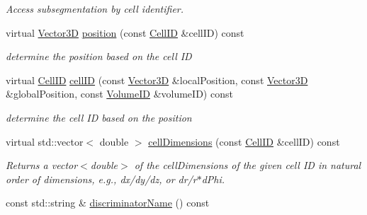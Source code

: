\begin{DoxyCompactItemize}
\begin{DoxyCompactList}\small\item\em Access subsegmentation by cell identifier. \item\end{DoxyCompactList}\item 
virtual \hyperlink{struct_d_d4hep_1_1_d_d_segmentation_1_1_vector3_d}{Vector3D} \hyperlink{class_d_d4hep_1_1_d_d_segmentation_1_1_multi_segmentation_abbcc00c36274bb97c5ff3d01d64e45b6}{position} (const \hyperlink{namespace_d_d4hep_1_1_d_d_segmentation_ac7af071d85cb48820914434a07e21ba1}{CellID} \&cellID) const 
\begin{DoxyCompactList}\small\item\em determine the position based on the cell ID \item\end{DoxyCompactList}\item 
virtual \hyperlink{namespace_d_d4hep_1_1_d_d_segmentation_ac7af071d85cb48820914434a07e21ba1}{CellID} \hyperlink{class_d_d4hep_1_1_d_d_segmentation_1_1_multi_segmentation_aefbdc896e43100b7781e07dafc9a9fec}{cellID} (const \hyperlink{struct_d_d4hep_1_1_d_d_segmentation_1_1_vector3_d}{Vector3D} \&localPosition, const \hyperlink{struct_d_d4hep_1_1_d_d_segmentation_1_1_vector3_d}{Vector3D} \&globalPosition, const \hyperlink{namespace_d_d4hep_1_1_d_d_segmentation_a61a6833a18d1800bdef176595f83e3ba}{VolumeID} \&volumeID) const 
\begin{DoxyCompactList}\small\item\em determine the cell ID based on the position \item\end{DoxyCompactList}\item 
virtual std::vector$<$ double $>$ \hyperlink{class_d_d4hep_1_1_d_d_segmentation_1_1_multi_segmentation_a2762cc8dd45fdfcab8aa8dfaea47e7fd}{cellDimensions} (const \hyperlink{namespace_d_d4hep_1_1_d_d_segmentation_ac7af071d85cb48820914434a07e21ba1}{CellID} \&cellID) const 
\begin{DoxyCompactList}\small\item\em Returns a vector$<$double$>$ of the cellDimensions of the given cell ID in natural order of dimensions, e.g., dx/dy/dz, or dr/r$\ast$dPhi. \item\end{DoxyCompactList}\item 
const std::string \& \hyperlink{class_d_d4hep_1_1_d_d_segmentation_1_1_multi_segmentation_a4be6f41c8a5f08fec8c2a5cc3cb47e6c}{discriminatorName} () const 

\end{DoxyCompactItemize}
